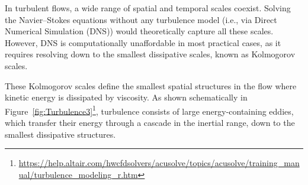 

In turbulent flows, a wide range of spatial and temporal scales coexist. Solving the Navier–Stokes equations without any turbulence model (i.e., via Direct Numerical Simulation (DNS)) would theoretically capture all these scales. However, DNS is computationally unaffordable in most practical cases, as it requires resolving down to the smallest dissipative scales, known as Kolmogorov scales.

These Kolmogorov scales define the smallest spatial structures in the flow where kinetic energy is dissipated by viscosity. As shown schematically in Figure~\ref{fig:Turbulence3}\footnote{\url{https://help.altair.com/hwcfdsolvers/acusolve/topics/acusolve/training_manual/turbulence_modeling_r.htm}}, turbulence consists of large energy-containing eddies, which transfer their energy through a cascade in the inertial range, down to the smallest dissipative structures.

